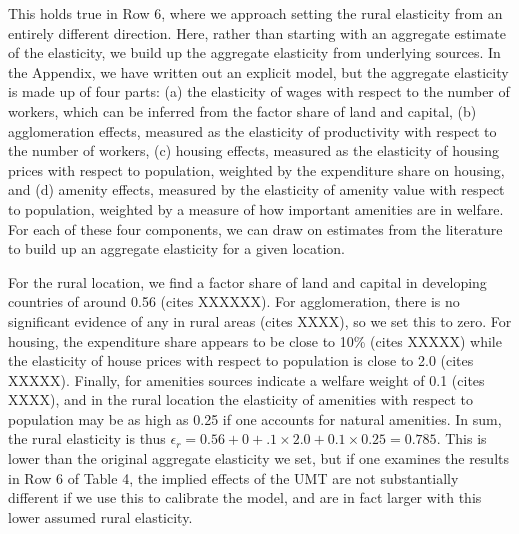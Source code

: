 \documentclass[10pt]{article}
\begin{document}
This holds true in Row 6, where we approach setting the rural elasticity from an entirely different direction. Here, rather than starting with an aggregate estimate of the elasticity, we build up the aggregate elasticity from underlying sources. In the Appendix, we have written out an explicit model, but the aggregate elasticity is made up of four parts: (a) the elasticity of wages with respect to the number of workers, which can be inferred from the factor share of land and capital, (b) agglomeration effects, measured as the elasticity of productivity with respect to the number of workers, (c) housing effects, measured as the elasticity of housing prices with respect to population, weighted by the expenditure share on housing, and (d) amenity effects, measured by the elasticity of amenity value with respect to population, weighted by a measure of how important amenities are in welfare. For each of these four components, we can draw on estimates from the literature to build up an aggregate elasticity for a given location.

For the rural location, we find a factor share of land and capital in developing countries of around 0.56 (cites XXXXXX). For agglomeration, there is no significant evidence of any in rural areas (cites XXXX), so we set this to zero. For housing, the expenditure share appears to be close to 10\% (cites XXXXX) while the elasticity of house prices with respect to population is close to 2.0 (cites XXXXX). Finally, for amenities sources indicate a welfare weight of 0.1 (cites XXXX), and in the rural location the elasticity of amenities with respect to population may be as high as 0.25 if one accounts for natural amenities. In sum, the rural elasticity is thus $\epsilon_r = 0.56 + 0 + .1\times2.0 + 0.1 \times 0.25 = 0.785$. This is lower than the original aggregate elasticity we set, but if one examines the results in Row 6 of Table 4, the implied effects of the UMT are not substantially different if we use this to calibrate the model, and are in fact larger with this lower assumed rural elasticity. 
\end{document}
